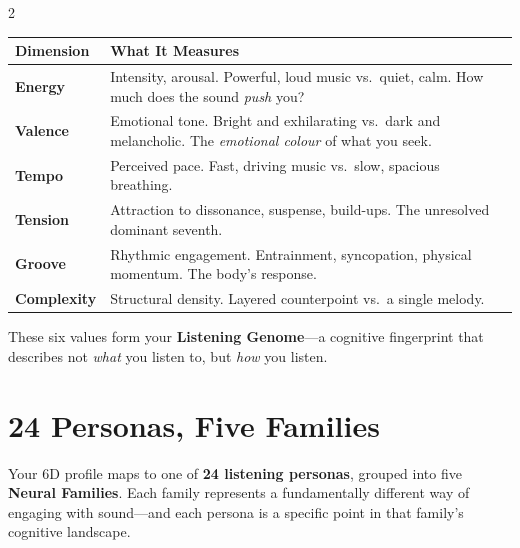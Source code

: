 \documentclass[10pt,a4paper]{article}
\begin{document}
\begin{multicols}{2}
{\small
\begin{tabular}{@{}p{1.8cm}p{5cm}@{}}
  \toprule
  \textbf{\sffamily Dimension} & \textbf{\sffamily What It Measures} \\
  \midrule
  \textcolor{rose}{\sffamily\bfseries Energy} &
    Intensity, arousal. Powerful, loud music vs.\ quiet, calm. How much does the sound \emph{push} you? \\[4pt]
  \textcolor{sky}{\sffamily\bfseries Valence} &
    Emotional tone. Bright and exhilarating vs.\ dark and melancholic. The \emph{emotional colour} of what you seek. \\[4pt]
  \textcolor{kine}{\sffamily\bfseries Tempo} &
    Perceived pace. Fast, driving music vs.\ slow, spacious breathing. \\[4pt]
  \textcolor{alch}{\sffamily\bfseries Tension} &
    Attraction to dissonance, suspense, build-ups. The unresolved dominant seventh. \\[4pt]
  \textcolor{sage}{\sffamily\bfseries Groove} &
    Rhythmic engagement. Entrainment, syncopation, physical momentum. The body's response. \\[4pt]
  \textcolor{arch}{\sffamily\bfseries Complexity} &
    Structural density. Layered counterpoint vs.\ a single melody. \\
  \bottomrule
\end{tabular}
}

\vspace{6pt}

These six values form your \textbf{Listening Genome}---a cognitive fingerprint that describes not \emph{what} you listen to, but \emph{how} you listen.

\end{multicols}

\newpage

\section{24 Personas, Five Families}

\vspace{2pt}

Your 6D profile maps to one of \textbf{24 listening personas}, grouped into five \textbf{Neural Families}. Each family represents a fundamentally different way of engaging with sound---and each persona is a specific point in that family's cognitive landscape.
\end{document}
